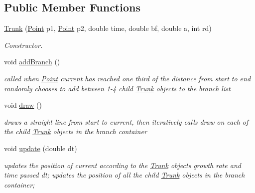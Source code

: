 \subsection*{Public Member Functions}
\begin{DoxyCompactItemize}
\item 
\mbox{\hyperlink{class_trunk_a01d439d00e7e118af0f6e33626e773d1}{Trunk}} (\mbox{\hyperlink{struct_point}{Point}} p1, \mbox{\hyperlink{struct_point}{Point}} p2, double time, double bf, double a, int rd)
\begin{DoxyCompactList}\small\item\em Constructor. \end{DoxyCompactList}\item 
void \mbox{\hyperlink{class_trunk_a04d06f2095aeff41ae3413866c128b8a}{add\+Branch}} ()
\begin{DoxyCompactList}\small\item\em called when \mbox{\hyperlink{struct_point}{Point}} current has reached one third of the distance from start to end randomly chooses to add between 1-\/4 child \mbox{\hyperlink{class_trunk}{Trunk}} objects to the branch list \end{DoxyCompactList}\item 
\mbox{\label{class_trunk_a14013f7f50839be7274e7ea09991df39}} 
void \mbox{\hyperlink{class_trunk_a14013f7f50839be7274e7ea09991df39}{draw}} ()
\begin{DoxyCompactList}\small\item\em draws a straight line from start to current, then iteratively calls draw on each of the child \mbox{\hyperlink{class_trunk}{Trunk}} objects in the branch container \end{DoxyCompactList}\item 
\mbox{\label{class_trunk_ab62c99b7a3ad20b53d81b87afa91d28d}} 
void \mbox{\hyperlink{class_trunk_ab62c99b7a3ad20b53d81b87afa91d28d}{update}} (double dt)
\begin{DoxyCompactList}\small\item\em updates the position of current according to the \mbox{\hyperlink{class_trunk}{Trunk}} objects growth rate and time passed dt; updates the position of all the child \mbox{\hyperlink{class_trunk}{Trunk}} objects in the branch container; \end{DoxyCompactList}\end{DoxyCompactItemize}


